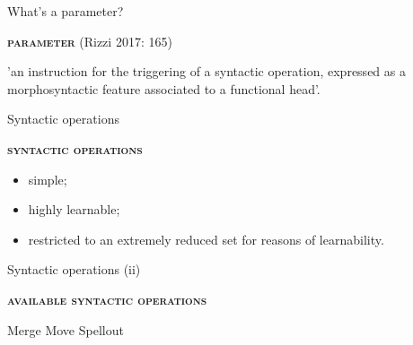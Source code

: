 \documentclass[lesson_slides]{subfiles}
\begin{document}
\begin{frame}[c]{What's a parameter?}

    \textbf{\textsc{parameter}} (Rizzi 2017: 165) \pause
    
    'an instruction for the triggering of a syntactic operation, expressed as a morphosyntactic feature
associated to a functional head'.

\end{frame}
\begin{frame}[c]{Syntactic operations}

    \noindent\textbf{\textsc{syntactic operations}} \pause
    \begin{itemize}
        \item[\ding{227}] simple; \pause
        \item[\ding{227}] highly learnable; \pause
        \item[\ding{227}] restricted to an extremely reduced set for reasons of learnability.
    \end{itemize}	
    
\end{frame}
\begin{frame}[c]{Syntactic operations (ii)}

    \noindent\textbf{\textsc{available syntactic operations}} \pause
        \begin{xlist}
            \ex Merge \pause
            \ex Move \pause
            \ex Spellout
        \end{xlist}
\end{frame}
\end{document}
